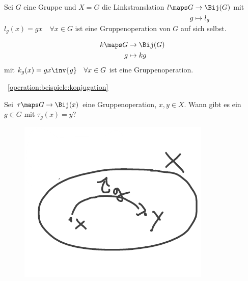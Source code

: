 \begin{beispiel}\label{operation:beispiele}
    \begin{eigenschaftenenumerate}
        \item \label{operation:beispiele:linkstranslation} Sei \( G \) eine Gruppe und \( X=G \) die Linkstranslation \( l\maps \begin{aligned}[t] 
            G&\to \Bij(G)\\
            g&\mapsto l_g
        \end{aligned} \) mit \( l_g(x)=gx \quad\forall x\in G \) ist eine Gruppenoperation von \( G \) auf sich selbst.
        
        \item \label{operation:beispiele:konjugation}\begin{align*}
            k\maps \begin{aligned}[t] 
                G &\to \Bij(G)\\
                g &\mapsto kg
            \end{aligned}
        \end{align*}
        mit \( k_g(x)=gx\inv{g} \quad\forall x\in G \) ist eine Gruppenoperation.
    \end{eigenschaftenenumerate}
\end{beispiel}
~\ref{operation:beispiele:konjugation}
\begin{frage*}
    Sei \( \tau\maps G\to \Bij(x) \) eine Gruppenoperation, \( x,y\in X \). 
    Wann gibt es ein \( g\in G \) mit \( \tau_g(x)=y \)?
    \begin{figure}[H]
        \centering
        \includegraphics[width=0.5\linewidth]{figures/einfach_transitiv}
        \label{fig:einfach_transitiv}
    \end{figure}
    
\end{frage*}

